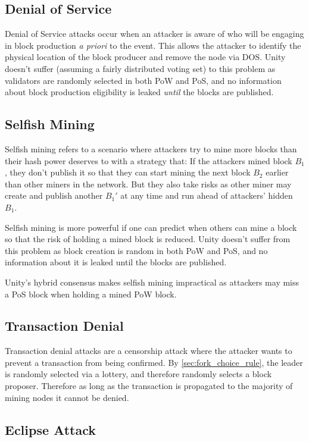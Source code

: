 \documentclass[a4paper]{article}
\begin{document}
\subsection{Denial of Service}

Denial of Service attacks occur when an attacker is aware of who will be engaging in block production \textit{a priori} to the event. This allows the attacker to identify the physical location of the block producer and remove the node via DOS. Unity doesn't suffer (assuming a fairly distributed voting set) to this problem as validators are randomly selected in both PoW and PoS, and no information about block production eligibility is leaked \textit{until} the blocks are published.

\subsection{Selfish Mining}

Selfish mining refers to a scenario where attackers try to mine more blocks than their hash power deserves to with a strategy that: If the attackers mined block $B_1$, they don't publish it so that they can start mining the next block $B_2$ earlier than other miners in the network. But they also take risks as other miner may create and publish another $B_1'$ at any time and run ahead of attackers' hidden $B_1$.

Selfish mining is more powerful if one can predict when others can mine a block so that the risk of holding a mined block is reduced. Unity doesn't suffer from this problem as block creation is random in both PoW and PoS, and no information about it is leaked until the blocks are published.

Unity's hybrid consensus makes selfish mining impractical as attackers may miss a PoS block when holding a mined PoW block.

\subsection{Transaction Denial}

Transaction denial attacks are a censorship attack where the attacker wants to prevent a transaction from being confirmed. By \cref{sec:fork_choice_rule}, the leader is randomly selected via a lottery, and therefore randomly selects a block proposer. Therefore as long as the transaction is propagated to the majority of mining nodes it cannot be denied.

\subsection{Eclipse Attack}
\end{document}
